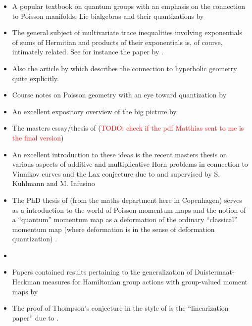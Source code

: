 \documentclass[notitlepage]{article}
\begin{document}
\begin{itemize}
    \item A popular textbook on quantum groups with an emphasis on the connection to Poisson manifolds, Lie bialgebras and their quantizations by \citeauthor{chari1995guide} \cite{chari1995guide}
    \item The general subject of multivariate trace inequalities involving exponentials of sums of Hermitian and products of their exponentials is, of course, intimately related. See for instance the paper by \citeauthor{sutter2017multivariate} \cite{sutter2017multivariate}.
    \item Also the article \cite{forrester2014golden} by \citeauthor{forrester2014golden} which describes the connection to hyperbolic geometry quite explicitly.
    \item Course notes on Poisson geometry with an eye toward quantization by \citeauthor{ciccoli2006poisson} \cite{ciccoli2006poisson}
    \item An excellent expository overview of the big picture by \citeauthor{knutson2000symplectic} \cite{knutson2000symplectic}
    \item The masters essay/thesis of \citeauthor{backens2010sixjsymbols} (\textcolor{red}{TODO: check if the pdf Matthias sent to me is the final version}) \cite{backens2010sixjsymbols}
    \item An excellent introduction to these ideas is the recent masters thesis on various aspects of additive and multiplicative Horn problems in connection to Vinnikov curves and the Lax conjecture due to \citeauthor{hess2020examination} and supervised by S. Kuhlmann and M. Infusino \cite{hess2020examination}
    \item The PhD thesis of \citeauthor{esposito2012classical} (from the maths department here in Copenhagen) serves as a introduction to the world of Poisson momentum maps and the notion of a ``quantum'' momentum map as a deformation of the ordinary ``classical'' momentum map (where deformation is in the sense of deformation quantization) \cite{esposito2012classical}.
    \item \citeauthor{alekseev1997poisson} \cite{alekseev1997poisson}
    \item Papers contained results pertaining to the generalization of Duistermaat-Heckman measures for Hamiltonian group actions with group-valued moment maps by \citeauthor{alekseev2000group} \cite{alekseev1999duistermaat,alekseev2000group}
    \item The proof of Thompson's conjecture in the style of \citeauthor{alekseev2001linearization} is the ``linearization paper'' due to \cite{alekseev2001linearization}. 

\end{itemize}
\end{document}
